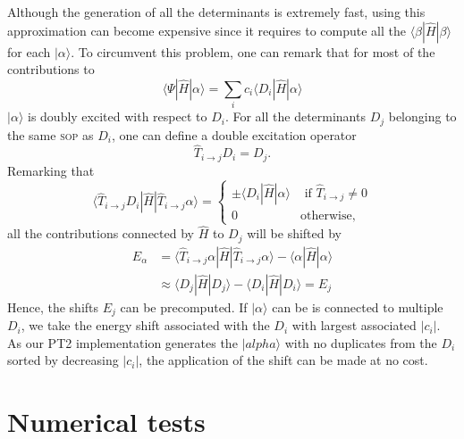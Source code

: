 \documentclass[aip,jcp,reprint,showkeys]{revtex4-1}
\newcommand{\ket}[1]{|#1\rangle}
\newcommand{\sop}{\textsc{sop}}
\newcommand{\mel}[3]{\langle #1 | #2 | #3 \rangle}
\begin{document}
Although the generation of all the determinants is extremely fast, using
this approximation can become expensive since it requires to compute
all the $\mel{\beta}{\hat{H}}{\beta}$ for each $\ket{\alpha}$.
To circumvent this problem, one can remark that for most of the contributions to
\begin{equation}
 \langle \Psi | \hat{H} | \alpha \rangle = \sum_i c_i \langle D_i | \hat{H} | \alpha \rangle
\end{equation}
$\ket{\alpha}$ is doubly excited with respect to $D_i$.
For all the determinants $D_j$ belonging to the same \sop{} as $D_i$, one can
define a double excitation operator
\begin{equation}
\hat{T}_{i\rightarrow j} D_i = D_j.
\end{equation}
Remarking that
\begin{equation}
\langle \hat{T}_{i\rightarrow j} D_i | \hat{H} | \hat{T}_{i\rightarrow j} \alpha \rangle =
\begin{cases}
\pm \langle D_i | \hat{H} | \alpha \rangle & \text{ if } \hat{T}_{i\rightarrow j} \ne 0 \\
0 & \text{otherwise},
\end{cases}
\end{equation}
all the contributions connected by $\hat{H}$ to $D_j$ will be shifted by 
\begin{align}
E_\alpha & = \langle \hat{T}_{i\rightarrow j} \alpha | \hat{H} | \hat{T}_{i\rightarrow j} \alpha \rangle - \langle \alpha | \hat{H} | \alpha \rangle \\
         & \approx \langle D_j | \hat{H} | D_j \rangle - \langle D_i | \hat{H} | D_i \rangle  = E_j
\end{align}
Hence, the shifts $E_j$ can be precomputed.
If $\ket{\alpha}$ can be is connected to multiple $D_i$, we take the energy shift
associated with the $D_i$ with largest associated $|c_i|$.
As our PT2 implementation generates the $\ket{alpha}$ with no duplicates 
from the $D_i$ sorted by decreasing $|c_i|$, the application of the shift can be
made at no cost.





\section{Numerical tests}
\end{document}
